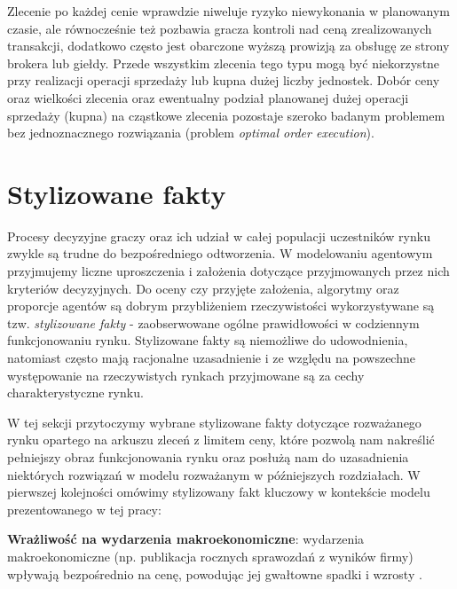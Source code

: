 Zlecenie po każdej cenie wprawdzie niweluje ryzyko niewykonania w planowanym czasie, ale równocześnie też pozbawia gracza kontroli nad ceną zrealizowanych transakcji, dodatkowo często jest obarczone wyższą prowizją za obsługę ze strony brokera lub giełdy. Przede wszystkim zlecenia tego typu mogą być niekorzystne przy realizacji operacji sprzedaży lub kupna dużej liczby jednostek. Dobór ceny oraz wielkości zlecenia oraz ewentualny podział planowanej dużej operacji sprzedaży (kupna) na cząstkowe zlecenia pozostaje szeroko badanym problemem bez jednoznacznego rozwiązania (problem \textit{optimal order execution}). 
\section{Stylizowane fakty}

Procesy decyzyjne graczy oraz ich udział w całej populacji uczestników rynku zwykle są trudne do bezpośredniego odtworzenia. W modelowaniu agentowym przyjmujemy liczne uproszczenia i założenia dotyczące przyjmowanych przez nich kryteriów decyzyjnych. Do oceny czy przyjęte założenia, algorytmy oraz proporcje agentów są dobrym przybliżeniem rzeczywistości wykorzystywane są tzw. \textit{stylizowane fakty} - zaobserwowane ogólne prawidłowości w codziennym funkcjonowaniu rynku. Stylizowane fakty są niemożliwe do udowodnienia, natomiast często mają racjonalne uzasadnienie i ze względu na powszechne występowanie na rzeczywistych rynkach przyjmowane są za cechy charakterystyczne rynku. 

W tej sekcji przytoczymy wybrane stylizowane fakty dotyczące rozważanego rynku opartego na arkuszu zleceń z limitem ceny, które pozwolą nam nakreślić pełniejszy obraz funkcjonowania rynku oraz posłużą nam do uzasadnienia niektórych rozwiązań w modelu rozważanym w późniejszych rozdziałach. W pierwszej kolejności omówimy stylizowany fakt kluczowy w kontekście modelu prezentowanego w tej pracy:

\begin{fact}\label{fact:events}
\textbf{Wrażliwość na wydarzenia makroekonomiczne}: wydarzenia makroekonomiczne (np. publikacja rocznych sprawozdań z wyników firmy) wpływają bezpośrednio na cenę, powodując jej gwałtowne spadki i wzrosty \cite{eventresponse}.
\end{fact}

